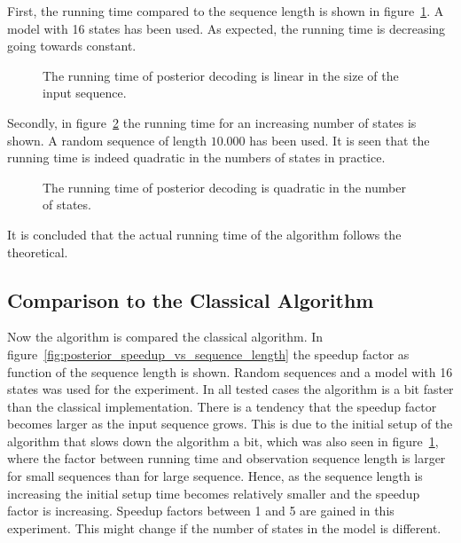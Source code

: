 First, the running time compared to the sequence length is shown in
figure~\ref{fig:posterior_T}. A model with 16 states has been used. As expected,
the running time is decreasing going towards constant.

\begin{figure}
  \centering
  
  \caption{The running time of posterior decoding is linear in the size of the
    input sequence.}
  \label{fig:posterior_T}
\end{figure}

Secondly, in figure~\ref{fig:posterior_N} the running time for an increasing
number of states is shown. A random sequence of length $10.000$ has been used. It
is seen that the running time is indeed quadratic in the numbers of states
in practice.

\begin{figure}
  \centering
  
  \caption{The running time of posterior decoding is quadratic in the number of
    states.}
  \label{fig:posterior_N}
\end{figure}

It is concluded that the actual running time of the algorithm follows the
theoretical.

\subsection{Comparison to the Classical Algorithm}
\label{sec:comp-class-algor}

Now the algorithm is compared the classical algorithm. In
figure~\ref{fig:posterior_speedup_vs_sequence_length} the speedup factor as
function of the sequence length is shown. Random sequences and a model with 16
states was used for the experiment. In all tested cases the algorithm is a bit
faster than the classical implementation. There is a tendency that the speedup
factor becomes larger as the input sequence grows. This is due to the initial
setup of the algorithm that slows down the algorithm a bit, which was also seen
in figure~\ref{fig:posterior_T}, where the factor between running time and
observation sequence length is larger for small sequences than for large
sequence. Hence, as the sequence length is increasing the initial setup time
becomes relatively smaller and the speedup factor is increasing. Speedup
factors between 1 and 5 are gained in this experiment. This might change if the
number of states in the model is different. 

